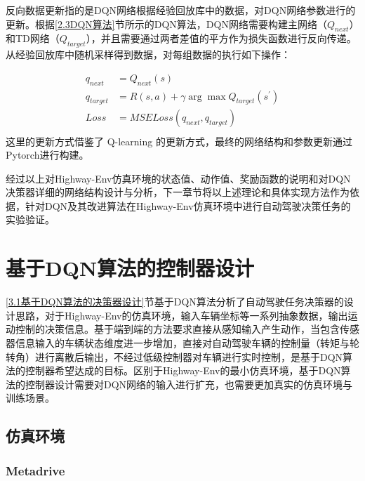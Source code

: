 反向数据更新指的是DQN网络根据经验回放库中的数据，对DQN网络参数进行的更新。根据\ref{2.3DQN算法}节所示的DQN算法，DQN网络需要构建主网络（$Q_{next}$）和TD网络（$Q_{target}$），并且需要通过两者差值的平方作为损失函数进行反向传递。从经验回放库中随机采样得到数据，对每组数据的执行如下操作：

\begin{equation}
    \begin{aligned}
        q_{next} &= Q_{next}(s)\\
        q_{target} &= R(s,a) + \gamma \arg \max Q_{target}(s^{'})\\
        Loss &= MSELoss(q_{next},q_{target})\\
    \end{aligned}
\end{equation}
这里的更新方式借鉴了 Q-learning 的更新方式，最终的网络结构和参数更新通过Pytorch进行构建。

经过以上对Highway-Env仿真环境的状态值、动作值、奖励函数的说明和对DQN决策器详细的网络结构设计与分析，下一章节将以上述理论和具体实现方法作为依据，针对DQN及其改进算法在Highway-Env仿真环境中进行自动驾驶决策任务的实验验证。

\section{基于DQN算法的控制器设计} %

\ref{3.1基于DQN算法的决策器设计}节基于DQN算法分析了自动驾驶任务决策器的设计思路，对于Highway-Env的仿真环境，输入车辆坐标等一系列抽象数据，输出运动控制的决策信息。基于端到端的方法要求直接从感知输入产生动作，当包含传感器信息输入的车辆状态维度进一步增加，直接对自动驾驶车辆的控制量（转矩与轮转角）进行离散后输出，不经过低级控制器对车辆进行实时控制，是基于DQN算法的控制器希望达成的目标。区别于Highway-Env的最小仿真环境，基于DQN算法的控制器设计需要对DQN网络的输入进行扩充，也需要更加真实的仿真环境与训练场景。

\subsection{仿真环境}

\subsubsection{Metadrive}

